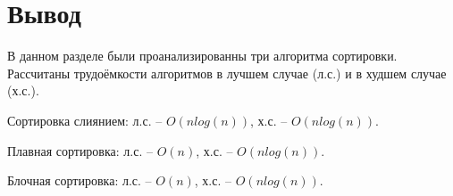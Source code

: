 \begin{center}
	\label{ris:imageSS5}
\newpage
	\centering
	\def\svgwidth{14cm}
	
	\label{ris:imageSS6}
\newpage
	\centering
		\def\svgwidth{17cm}
	
	\label{ris:imageSS7}


\newpage
	\centering
	\def\svgwidth{12cm} %
	
	\label{ris:imageSC}
\newpage
	\centering
	\def\svgwidth{11cm}
	
	\label{ris:imageSC1}
\newpage
	\centering
	
	\label{ris:imageSC2}

\newpage
	\centering
	\def\svgwidth{7cm}
	
	\label{ris:imageSB}
\newpage

\centering
\def\svgwidth{4cm}

\label{ris:imageSB2}

\newpage
\end{center}
\newpage

\section*{Вывод}
В данном разделе были проанализированны три алгоритма сортировки. Рассчитаны трудоёмкости алгоритмов в лучшем случае (л.с.) и в худшем случае (х.с.).

Сортировка слиянием: л.с. -- $O(nlog(n))$, х.с. -- $O(nlog(n))$.

Плавная сортировка: л.с. -- $O(n)$,  х.с. --  $O(nlog(n))$.

Блочная сортировка: л.с. -- $O(n)$,  х.с. -- $O(nlog(n))$.